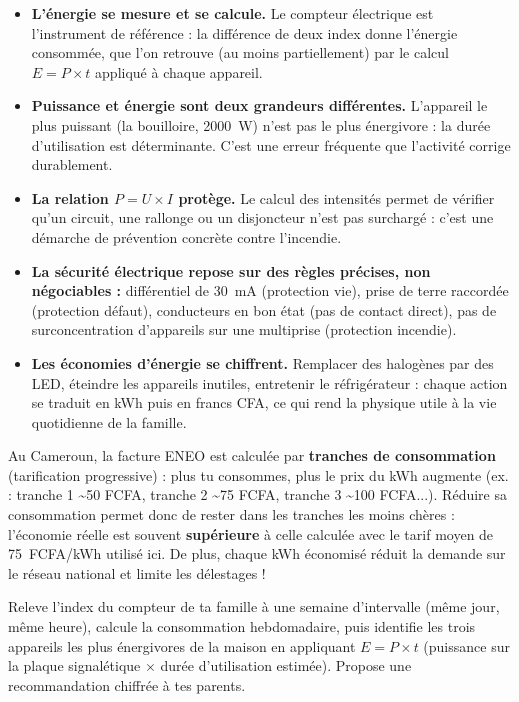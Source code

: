 \documentclass[11pt]{article}
\begin{document}
\begin{itemize}
\item \textbf{L'énergie se mesure et se calcule.} Le compteur électrique est l'instrument de référence : la différence de deux index donne l'énergie consommée, que l'on retrouve (au moins partiellement) par le calcul $E = P \times t$ appliqué à chaque appareil.
\item \textbf{Puissance et énergie sont deux grandeurs différentes.} L'appareil le plus puissant (la bouilloire, \SI{2000}{W}) n'est pas le plus énergivore : la durée d'utilisation est déterminante. C'est une erreur fréquente que l'activité corrige durablement.
\item \textbf{La relation $P = U \times I$ protège.} Le calcul des intensités permet de vérifier qu'un circuit, une rallonge ou un disjoncteur n'est pas surchargé : c'est une démarche de prévention concrète contre l'incendie.
\item \textbf{La sécurité électrique repose sur des règles précises, non négociables :} différentiel de \SI{30}{mA} (protection vie), prise de terre raccordée (protection défaut), conducteurs en bon état (pas de contact direct), pas de surconcentration d'appareils sur une multiprise (protection incendie).
\item \textbf{Les économies d'énergie se chiffrent.} Remplacer des halogènes par des LED, éteindre les appareils inutiles, entretenir le réfrigérateur : chaque action se traduit en \si{kWh} puis en francs CFA, ce qui rend la physique utile à la vie quotidienne de la famille.
\end{itemize}

\begin{savaistu}
Au Cameroun, la facture ENEO est calculée par \textbf{tranches de consommation} (tarification progressive) : plus tu consommes, plus le prix du \si{kWh} augmente (ex. : tranche 1 \textasciitilde 50 FCFA, tranche 2 \textasciitilde 75 FCFA, tranche 3 \textasciitilde 100 FCFA...). Réduire sa consommation permet donc de rester dans les tranches les moins chères : l'économie réelle est souvent \textbf{supérieure} à celle calculée avec le tarif moyen de \SI{75}{FCFA/kWh} utilisé ici. De plus, chaque \si{kWh} économisé réduit la demande sur le réseau national et limite les délestages !
\end{savaistu}

\begin{exercice}
Releve l'index du compteur de ta famille à une semaine d'intervalle (même jour, même heure), calcule la consommation hebdomadaire, puis identifie les trois appareils les plus énergivores de la maison en appliquant $E = P \times t$ (puissance sur la plaque signalétique $\times$ durée d'utilisation estimée). Propose une recommandation chiffrée à tes parents.
\end{exercice}
\end{document}
